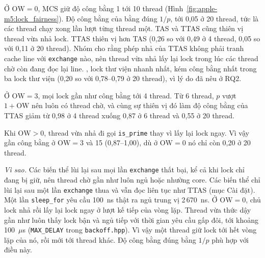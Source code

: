 
Ở $\mathrm{OW} = 0$, MCS giữ độ công bằng 1 tới 10 thread (Hình~\ref{fig:apple-m5:lock_fairness}). Độ
công bằng của  bằng đúng $1/p$, tới 0,05 ở 20 thread, tức là các thread chạy xong
lần lượt từng thread một. TAS và TTAS cũng thiên vị thread vừa nhả lock. TTAS thiên vị hơn TAS (0,26 so
với 0,49 ở 4 thread, 0,05 so với 0,11 ở 20 thread). Nhóm cho rằng phép nhả của TTAS không phải tranh
cache line với \texttt{exchange} nào, nên thread vừa nhả lấy lại lock trong lúc các thread chờ còn đang
đọc lại line. , lock thư viện nhanh nhất, kém công bằng nhất trong ba lock thư
viện (0,20 so với 0,78--0,79 ở 20 thread), vì lý do đã nêu ở RQ2.

Ở $\mathrm{OW} = 3$, mọi lock gần như công bằng tới 4 thread. Từ 6 thread, $p$ vượt
$1+\mathrm{OW}$ nên luôn có thread chờ, và cùng sự thiên vị đó làm độ công bằng của TTAS giảm từ 0,98 ở 4 thread xuống
0,87 ở 6 thread và 0,55 ở 20 thread.

Khi $\mathrm{OW} > 0$, thread vừa nhả đi gọi \texttt{is\_prime} thay vì lấy lại lock ngay. Vì vậy
 gần công bằng ở $\mathrm{OW} = 3$ và 15 (0,87--1,00), dù ở $\mathrm{OW} = 0$
nó chỉ còn 0,20 ở 20 thread.

\emph{Vì sao.} Các biến thể  lùi lại sau mọi lần \texttt{exchange} thất bại, kể cả khi
lock chỉ đang bị giữ, nên thread chờ gần như luôn ngủ hoặc nhường core. Các biến thể 
chỉ lùi lại sau một lần \texttt{exchange} thua và vẫn đọc liên tục như TTAS (mục Cài đặt). Một lần
\texttt{sleep\_for} yêu cầu 100~ns thật ra ngủ trung vị 2\,670~ns. Ở $\mathrm{OW} = 0$, chủ lock nhả
rồi lấy lại lock ngay ở lượt kế tiếp của vòng lặp. Thread vừa thức dậy gần như luôn thấy lock bận và
ngủ tiếp với thời gian yêu cầu gấp đôi, tới khoảng 100~$\mu$s (\texttt{MAX\_DELAY} trong
\texttt{backoff.hpp}). Vì vậy một thread giữ lock tới hết vòng lặp của nó, rồi mới tới thread khác. Độ
công bằng đúng bằng $1/p$ phù hợp với điều này.


